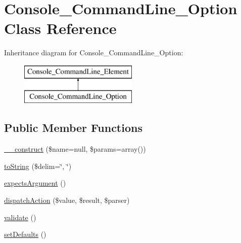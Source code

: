 \hypertarget{class_console___command_line___option}{
\section{Console\_\-CommandLine\_\-Option Class Reference}
\label{class_console___command_line___option}
}
Inheritance diagram for Console\_\-CommandLine\_\-Option:\begin{figure}[H]
\begin{center}
\leavevmode
\includegraphics[height=2.000000cm]{class_console___command_line___option}
\end{center}
\end{figure}
\subsection*{Public Member Functions}
\begin{DoxyCompactItemize}
\item 
\hyperlink{class_console___command_line___option_acce7c1c8eb94525cd672d1610bc1550e}{\_\-\_\-construct} (\$name=null, \$params=array())
\item 
\hyperlink{class_console___command_line___option_ac6a71376be3fe914f3ff1c0f7a438064}{toString} (\$delim=\char`\"{}, \char`\"{})
\item 
\hyperlink{class_console___command_line___option_a87469c37adf9122801880c2f23e36606}{expectsArgument} ()
\item 
\hyperlink{class_console___command_line___option_a0ecfad7330b11211d958ca9cb985b33f}{dispatchAction} (\$value, \$result, \$parser)
\item 
\hyperlink{class_console___command_line___option_a184909dab34698899937d810a9f5d393}{validate} ()
\item 
\hyperlink{class_console___command_line___option_ac900283b8780520c328c6457e34177f4}{setDefaults} ()
\end{DoxyCompactItemize}
